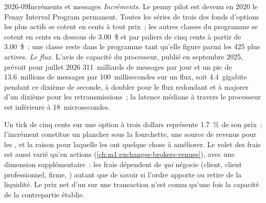 \begin{dated}{2026-09}{Incréments et messages}\label{dat:m1:options-market-structure:penny}
\emph{Incréments.} Le penny pilot est devenu en 2020 le Penny Interval Program
permanent. Toutes les séries de trois des fonds d'options les plus actifs se cotent en cents
à tout prix~; les autres classes du programme se cotent en cents en dessous de 3.00~\$ et
par paliers de cinq cents à partir de 3.00~\$~; une classe reste dans le programme tant
qu'elle figure parmi les 425 plus actives. \emph{Le flux.} L'avis de capacité du processeur,
publié en septembre 2025, prévoit pour juillet 2026 311~milliards de messages par jour et
un pic de 13.6~millions de messages par 100~millisecondes sur un flux, soit 4.4~gigabits
pendant ce dixième de seconde, à doubler pour le flux redondant et à majorer d'un
dixième pour les retransmissions~; la latence médiane à travers le processeur est inférieure
à 18~microsecondes.
\end{dated}

\begin{omfigure}

\label{fig:m1:options-market-structure:opra}
\end{omfigure}

Un tick de cinq cents sur une option à trois dollars représente 1.7~\% de son prix~:
l'incrément constitue un plancher sous la fourchette, une source de revenus pour les ,
et la raison pour laquelle les  ont quelque chose à améliorer. Le volet des
frais est aussi varié qu'en actions (\cref{ch:m1:exchanges-brokers-venues}),
avec une dimension supplémentaire~: les frais dépendent de \emph{qui} négocie (client,
client professionnel, firme, ) autant que de savoir si l'ordre
apporte ou retire de la liquidité. Le prix net d'un  sur une transaction n'est connu qu'une
fois la capacité de la contrepartie établie.

